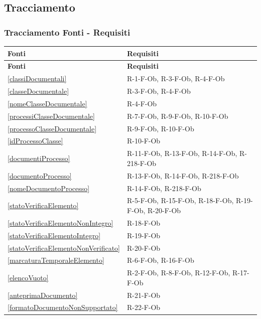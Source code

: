 \subsection{Tracciamento}

\subsubsection{Tracciamento Fonti - Requisiti}

\setlength{\LTleft}{\fill}
\setlength{\LTright}{\fill}
\begin{longtable}{|p{4cm}|p{10cm}|}
\hline
\rowcolor{zpusgreen!30}
\textbf{Fonti} & \textbf{Requisiti} \\
\hline
\endfirsthead
\rowcolor{zpusgreen!30}
\textbf{Fonti} & \textbf{Requisiti} \\
\hline
\endhead
\ref{classiDocumentali} & R-1-F-Ob, R-3-F-Ob, R-4-F-Ob \\
\hline
\ref{classeDocumentale} & R-3-F-Ob, R-4-F-Ob \\
\hline
\ref{nomeClasseDocumentale} & R-4-F-Ob \\
\hline
\ref{processiClasseDocumentale} & R-7-F-Ob, R-9-F-Ob, R-10-F-Ob \\
\hline
\ref{processoClasseDocumentale} & R-9-F-Ob, R-10-F-Ob \\
\hline
\ref{idProcessoClasse} & R-10-F-Ob \\
\hline
\ref{documentiProcesso} & R-11-F-Ob, R-13-F-Ob, R-14-F-Ob, R-218-F-Ob \\
\hline
\ref{documentoProcesso} & R-13-F-Ob, R-14-F-Ob, R-218-F-Ob \\
\hline
\ref{nomeDocumentoProcesso} & R-14-F-Ob, R-218-F-Ob \\
\hline
\ref{statoVerificaElemento} & R-5-F-Ob, R-15-F-Ob, R-18-F-Ob, R-19-F-Ob, R-20-F-Ob \\
\hline
\ref{statoVerificaElementoNonIntegro} & R-18-F-Ob \\
\hline
\ref{statoVerificaElementoIntegro} & R-19-F-Ob \\
\hline
\ref{statoVerificaElementoNonVerificato} & R-20-F-Ob \\
\hline
\ref{marcaturaTemporaleElemento} & R-6-F-Ob, R-16-F-Ob \\
\hline
\ref{elencoVuoto} & R-2-F-Ob, R-8-F-Ob, R-12-F-Ob, R-17-F-Ob \\
\hline
\ref{anteprimaDocumento} & R-21-F-Ob \\
\hline
\ref{formatoDocumentoNonSupportato} & R-22-F-Ob \\

\end{longtable}
